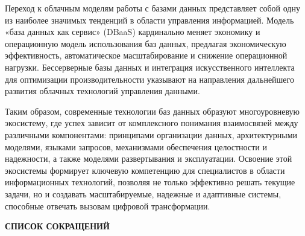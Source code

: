 \documentclass{SibFU-docs}
\begin{document}
Переход к облачным моделям работы с базами данных представляет собой одну из наиболее значимых тенденций в области управления информацией. Модель «база данных как сервис» (DBaaS) кардинально меняет экономику и операционную модель использования баз данных, предлагая экономическую эффективность, автоматическое масштабирование и снижение операционной нагрузки. Бессерверные базы данных и интеграция искусственного интеллекта для оптимизации производительности указывают на направления дальнейшего развития облачных технологий управления данными.

Таким образом, современные технологии баз данных образуют многоуровневую экосистему, где успех зависит от комплексного понимания взаимосвязей между различными компонентами: принципами организации данных, архитектурными моделями, языками запросов, механизмами обеспечения целостности и надежности, а также моделями развертывания и эксплуатации. Освоение этой экосистемы формирует ключевую компетенцию для специалистов в области информационных технологий, позволяя не только эффективно решать текущие задачи, но и создавать масштабируемые, надежные и адаптивные системы, способные отвечать вызовам цифровой трансформации.

\newpage
\begin{center}\textbf{СПИСОК СОКРАЩЕНИЙ}\end{center}
{}

\vspace{1em}
\end{document}
